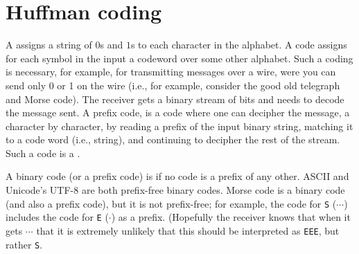 %

%




\ChapterPrefix{}
\ChapterGen{}





\section{Huffman coding}

A  assigns a string of $0$s and $1$s to each
character in the alphabet. A code assigns for each symbol in the input
a codeword over some other alphabet. Such a coding is necessary, for
example, for transmitting messages over a wire, were you can send only
0 or 1 on the wire (i.e., for example, consider the good old telegraph
and Morse code). The receiver gets a binary stream of bits and needs
to decode the message sent. A prefix code, is a code where one can
decipher the message, a character by character, by reading a prefix of
the input binary string, matching it to a code word (i.e., string),
and continuing to decipher the rest of the stream. Such a code is a
.

A binary code (or a prefix code) is  if no code is
a prefix of any other.  ASCII and Unicode's U{}T{}F-$8$ are both
prefix-free binary codes. Morse code is a binary code (and also a
prefix code), but it is not prefix-free; for example, the code for
\texttt{S} ($\cdots$) includes the code for \texttt{E} ($\cdot$) as a
prefix. (Hopefully the receiver knows that when it gets $\cdots$ that
it is extremely unlikely that this should be interpreted as
\texttt{E{}E{}E}, but rather \texttt{S}.

